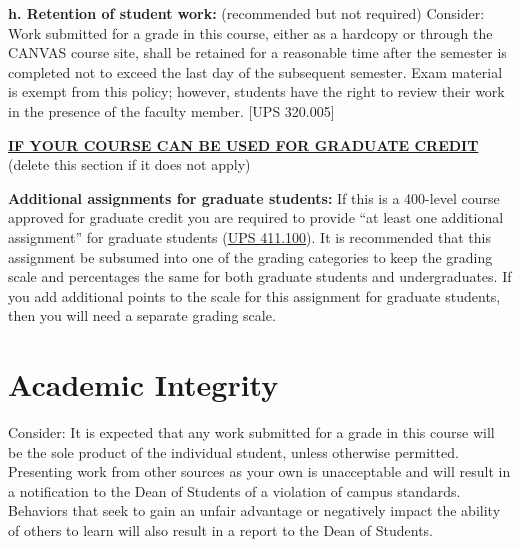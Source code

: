 \documentclass[12pt]{article}
\begin{document}
\vspace{1em}

\noindent \textbf{h. Retention of student work:} {\color{annotationblue}(recommended but not required)} {\color{suggestionred}Consider: Work submitted for a grade in this course, either as a hardcopy or through the CANVAS course site, shall be retained for a reasonable time after the semester is completed not to exceed the last day of the subsequent semester. Exam material is exempt from this policy; however, students have the right to review their work in the presence of the faculty member. [UPS 320.005]}

\vspace{1em}

\noindent \textbf{\underline{IF YOUR COURSE CAN BE USED FOR GRADUATE CREDIT}} {\color{annotationblue}(delete this section if it does not apply)}

\vspace{0.5em}

\noindent \textbf{Additional assignments for graduate students:} {\color{annotationblue}If this is a 400-level course approved for graduate credit you are required to provide ``at least one additional assignment'' for graduate students (\href{https://www.fullerton.edu/senate/publications_policies_resolutions/ups/UPS\%20400/UPS\%20411.100.pdf}{UPS 411.100}). It is recommended that this assignment be subsumed into one of the grading categories to keep the grading scale and percentages the same for both graduate students and undergraduates. If you add additional points to the scale for this assignment for graduate students, then you will need a separate grading scale.}

\section*{Academic Integrity}

 {\color{suggestionred}Consider: It is expected that any work submitted for a grade in this course will be the sole product of the individual student, unless otherwise permitted. Presenting work from other sources as your own is unacceptable and will result in a notification to the Dean of Students of a violation of campus standards. Behaviors that seek to gain an unfair advantage or negatively impact the ability of others to learn will also result in a report to the Dean of Students.}
\end{document}

